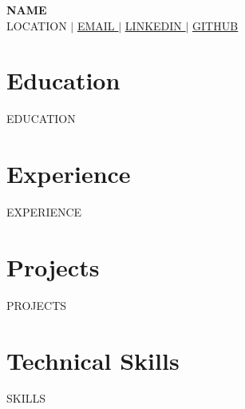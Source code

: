 \documentclass[letterpaper,11pt]{article}
\newcommand{\resumeSubHeadingListStart}{\begin{itemize}[leftmargin=0.15in, label={}]}
\newcommand{\resumeSubHeadingListEnd}{\end{itemize}}
\begin{document}
\begin{center}
    \textbf{\Huge \scshape {{NAME}}} \\ \vspace{1pt}
    \small {{LOCATION}} $|$ \href{mailto:{{EMAIL}}}{\underline{ {{EMAIL}} }} $|$ 
    \href{https://{{LINKEDIN}}}{\underline{ {{LINKEDIN}} }} $|$
    \href{https://{{GITHUB}}}{\underline{ {{GITHUB}} }}
\end{center}


\section{Education}
  \resumeSubHeadingListStart
    {{EDUCATION}}
  \resumeSubHeadingListEnd


\section{Experience}
  \resumeSubHeadingListStart
    {{EXPERIENCE}}
  \resumeSubHeadingListEnd


\section{Projects}
    \resumeSubHeadingListStart
      {{PROJECTS}}
    \resumeSubHeadingListEnd


\section{Technical Skills}
 \begin{itemize}[leftmargin=0.15in, label={}]
    \small{\item{
     {{SKILLS}}
    }}
 \end{itemize}


\end{document}

